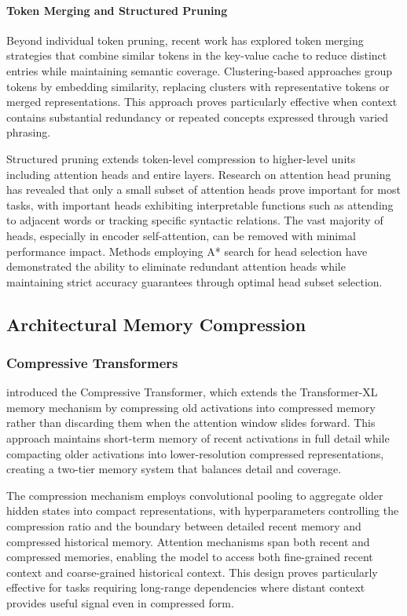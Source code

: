 \paragraph{Token Merging and Structured Pruning}

Beyond individual token pruning, recent work has explored token merging strategies that combine similar tokens in the key-value cache to reduce distinct entries while maintaining semantic coverage. Clustering-based approaches group tokens by embedding similarity, replacing clusters with representative tokens or merged representations. This approach proves particularly effective when context contains substantial redundancy or repeated concepts expressed through varied phrasing.

Structured pruning extends token-level compression to higher-level units including attention heads and entire layers. Research on attention head pruning has revealed that only a small subset of attention heads prove important for most tasks, with important heads exhibiting interpretable functions such as attending to adjacent words or tracking specific syntactic relations. The vast majority of heads, especially in encoder self-attention, can be removed with minimal performance impact. Methods employing A* search for head selection have demonstrated the ability to eliminate redundant attention heads while maintaining strict accuracy guarantees through optimal head subset selection.

\subsection{Architectural Memory Compression}

\subsubsection{Compressive Transformers}

\citet{rae2020compressive} introduced the Compressive Transformer, which extends the Transformer-XL memory mechanism by compressing old activations into compressed memory rather than discarding them when the attention window slides forward. This approach maintains short-term memory of recent activations in full detail while compacting older activations into lower-resolution compressed representations, creating a two-tier memory system that balances detail and coverage.

The compression mechanism employs convolutional pooling to aggregate older hidden states into compact representations, with hyperparameters controlling the compression ratio and the boundary between detailed recent memory and compressed historical memory. Attention mechanisms span both recent and compressed memories, enabling the model to access both fine-grained recent context and coarse-grained historical context. This design proves particularly effective for tasks requiring long-range dependencies where distant context provides useful signal even in compressed form.

